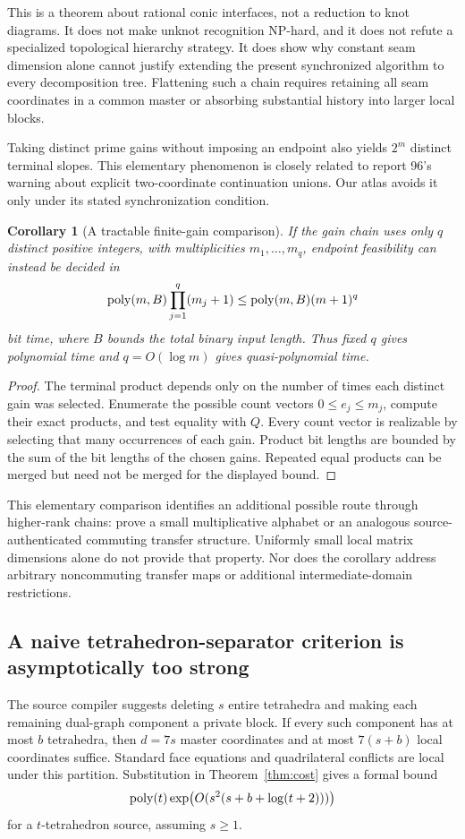 \documentclass[11pt,a4paper]{article}
\newtheorem{corollary}[theorem]{Corollary}
\theoremstyle{definition}
\theoremstyle{remark}
\begin{document}
This is a theorem about rational conic interfaces, not a reduction to knot diagrams. It does not make unknot recognition NP-hard, and it does not refute a specialized topological hierarchy strategy. It does show why constant seam dimension alone cannot justify extending the present synchronized algorithm to every decomposition tree. Flattening such a chain requires retaining all seam coordinates in a common master or absorbing substantial history into larger local blocks.

Taking distinct prime gains without imposing an endpoint also yields $2^m$ distinct terminal slopes. This elementary phenomenon is closely related to report 96's warning about explicit two-coordinate continuation unions. Our atlas avoids it only under its stated synchronization condition.

\begin{corollary}[A tractable finite-gain comparison]
\label{cor:gain-alphabet}
If the gain chain uses only $q$ distinct positive integers, with multiplicities $m_1,\ldots,m_q$, endpoint feasibility can instead be decided in
\[
 \operatorname{poly}(m,B)\prod_{j=1}^q(m_j+1)\le\operatorname{poly}(m,B)(m+1)^q
\]
bit time, where $B$ bounds the total binary input length. Thus fixed $q$ gives polynomial time and $q=O(\log m)$ gives quasi-polynomial time.
\end{corollary}
\begin{proof}
The terminal product depends only on the number of times each distinct gain was selected. Enumerate the possible count vectors $0\le e_j\le m_j$, compute their exact products, and test equality with $Q$. Every count vector is realizable by selecting that many occurrences of each gain. Product bit lengths are bounded by the sum of the bit lengths of the chosen gains. Repeated equal products can be merged but need not be merged for the displayed bound.
\end{proof}

This elementary comparison identifies an additional possible route through higher-rank chains: prove a small multiplicative alphabet or an analogous source-authenticated commuting transfer structure. Uniformly small local matrix dimensions alone do not provide that property. Nor does the corollary address arbitrary noncommuting transfer maps or additional intermediate-domain restrictions.

\subsection{A naive tetrahedron-separator criterion is asymptotically too strong}
The source compiler suggests deleting $s$ entire tetrahedra and making each remaining dual-graph component a private block. If every such component has at most $b$ tetrahedra, then $d=7s$ master coordinates and at most $7(s+b)$ local coordinates suffice. Standard face equations and quadrilateral conflicts are local under this partition. Substitution in Theorem~\ref{thm:cost} gives a formal bound
\begin{equation}
 \operatorname{poly}(t)\exp\bigl(O(s^2(s+b+\log(t+2)))\bigr)
 \label{eq:naive-tet}
\end{equation}
for a $t$-tetrahedron source, assuming $s\ge1$.
\end{document}
